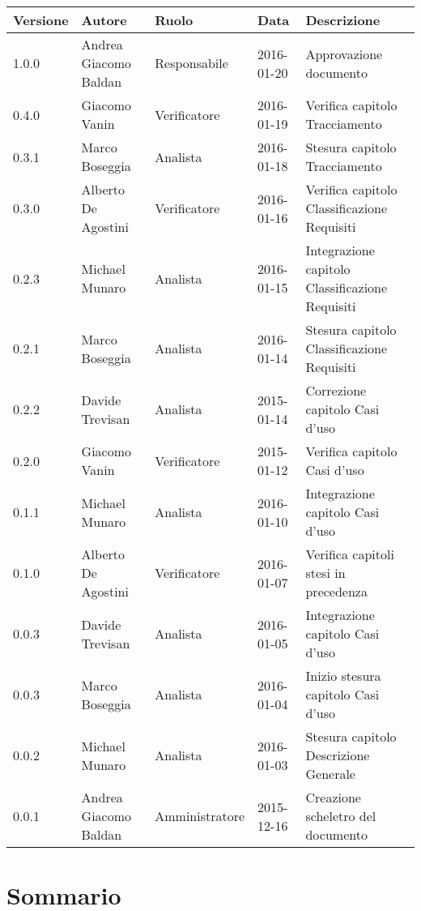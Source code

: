 \documentclass{scalatekids-article}
\begin{document}
\begin{center}
  \begin{tabular}{| l | l | l | l | p{5cm} |}
    \hline
    Versione & Autore & Ruolo & Data & Descrizione \\
    \hline
    1.0.0 & Andrea Giacomo Baldan & Responsabile & 2016-01-20 & Approvazione documento\\
    \hline
    0.4.0 & Giacomo Vanin & Verificatore & 2016-01-19 & Verifica capitolo Tracciamento\\
    \hline
    0.3.1 & Marco Boseggia & Analista & 2016-01-18 & Stesura capitolo Tracciamento\\
    \hline
    0.3.0 & Alberto De Agostini & Verificatore & 2016-01-16 & Verifica capitolo Classificazione Requisiti\\
    \hline
    0.2.3 & Michael Munaro & Analista & 2016-01-15 & Integrazione capitolo Classificazione Requisiti\\
    \hline
    0.2.1 & Marco Boseggia & Analista & 2016-01-14 & Stesura capitolo Classificazione Requisiti\\
    \hline
    0.2.2 & Davide Trevisan & Analista & 2015-01-14 & Correzione capitolo Casi d'uso\\
    \hline
    0.2.0 & Giacomo Vanin & Verificatore & 2015-01-12 & Verifica capitolo Casi d'uso\\
    \hline
    0.1.1 & Michael Munaro & Analista & 2016-01-10 & Integrazione capitolo Casi d'uso\\
    \hline
    0.1.0 & Alberto De Agostini & Verificatore & 2016-01-07 & Verifica capitoli stesi in precedenza\\
    \hline
    0.0.3 & Davide Trevisan & Analista & 2016-01-05 & Integrazione capitolo Casi d'uso\\
    \hline
    0.0.3 & Marco Boseggia & Analista & 2016-01-04 & Inizio stesura capitolo Casi d'uso\\
    \hline
    0.0.2 & Michael Munaro & Analista & 2016-01-03 & Stesura capitolo Descrizione Generale\\
    \hline
    0.0.1 & Andrea Giacomo Baldan & Amministratore & 2015-12-16 & Creazione scheletro del documento\\
    \hline
  \end{tabular}
\end{center}
\tableofcontents
\listoftables
\listoffigures
\newpage
{}
\section{Sommario}
\end{document}
